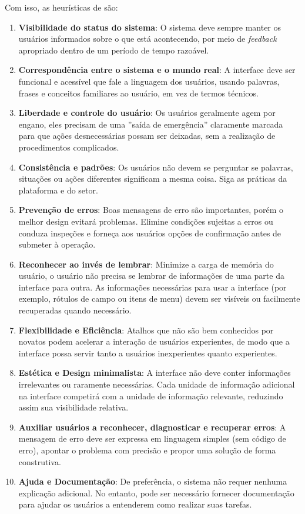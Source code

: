 Com isso, as heurísticas de  são:
\begin{enumerate}
    \item \textbf{Visibilidade do status do sistema}: O sistema deve sempre manter os usuários informados sobre o que está acontecendo, por meio de \textit{feedback} apropriado dentro de um período de tempo razoável.
    \item \textbf{Correspondência entre o sistema e o mundo real}: A interface deve ser funcional e acessível que fale a linguagem dos usuários, usando palavras, frases e conceitos familiares ao usuário, em vez de termos técnicos.
    \item \textbf{Liberdade e controle do usuário}: Os usuários geralmente agem por engano, eles precisam de uma ''saída de emergência'' claramente marcada para que ações desnecessárias possam ser deixadas, sem a realização de procedimentos complicados.
    \item \textbf{Consistência e padrões}: Os usuários não devem se perguntar se palavras, situações ou ações diferentes significam a mesma coisa. Siga as práticas da plataforma e do setor. 
    \item \textbf{Prevenção de erros}: Boas mensagens de erro são importantes, porém o melhor design evitará problemas. Elimine condições sujeitas a erros ou conduza inspeções e forneça aos usuários opções de confirmação antes de submeter à operação.
    \item \textbf{Reconhecer ao invés de lembrar}: Minimize a carga de memória do usuário, o usuário não precisa se lembrar de informações de uma parte da interface para outra. As informações necessárias para usar a interface (por exemplo, rótulos de campo ou itens de menu) devem ser visíveis ou facilmente recuperadas quando necessário.
    \item \textbf{Flexibilidade e Eficiência}: Atalhos que não são bem conhecidos por novatos podem acelerar a interação de usuários experientes, de modo que a interface possa servir tanto a usuários inexperientes quanto experientes.
    \item \textbf{Estética e Design minimalista}: A interface não deve conter informações irrelevantes ou raramente necessárias. Cada unidade de informação adicional na interface competirá com a unidade de informação relevante, reduzindo assim sua visibilidade relativa.
    \item \textbf{Auxiliar usuários a reconhecer, diagnosticar e recuperar erros}: A mensagem de erro deve ser expressa em linguagem simples (sem código de erro), apontar o problema com precisão e propor uma solução de forma construtiva. 
    \item \textbf{Ajuda e Documentação}: De preferência, o sistema não requer nenhuma explicação adicional. No entanto, pode ser necessário fornecer documentação para ajudar os usuários a entenderem como realizar suas tarefas.
\end{enumerate}

